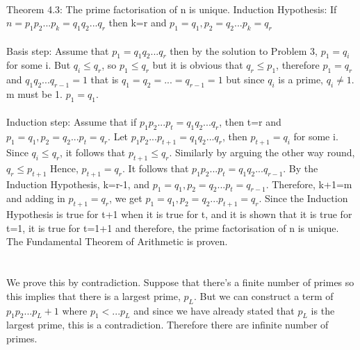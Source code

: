 \documentclass[a4paper,12pt]{article}
\begin{document}
\paragraph{}
Theorem 4.3: The prime factorisation of n is unique.
Induction Hypothesis: If $n=p_1p_2...p_k=q_1q_2...q_r$ then k=r and $p_1=q_1, p_2=q_2...p_k=q_r$
\paragraph{}
Basis step: Assume that $p_1=q_1q_2...q_r$ then by the solution to Problem 3, $p_1=q_i$ for some i. But $q_i\leq q_r$, so $p_1\leq q_r$ but it is obvious that $q_r\leq p_1$, therefore $p_1=q_r$ and $q_1q_2...q_{r-1}=1$ that is $q_1=q_2=...=q_{r-1}=1$ but since $q_i$ is a prime, $q_i\neq 1$. m must be 1. $p_1=q_1$.
\paragraph{}
Induction step: Assume that if $p_1p_2...p_t=q_1q_2...q_r$, then t=r and $p_1=q_1, p_2=q_2...p_t=q_r$. Let $p_1p_2...p_{t+1}=q_1q_2...q_r$, then $p_{t+1}=q_i$ for some i. Since $q_i\leq q_r$, it follows that $p_{t+1}\leq q_r$. Similarly by arguing the other way round, $q_r\leq p_{t+1}$ Hence, $p_{t+1}=q_r$. It follows that $p_1p_2...p_t=q_1q_2...q_{r-1}$. By the Induction Hypothesis, k=r-1, and $p_1=q_1, p_2=q_2...p_t=q_{r-1}$. Therefore, k+1=m and adding in $p_{t+1}=q_r$, we get $p_1=q_1, p_2=q_2...p_{t+1}=q_{r}$.
Since the Induction Hypothesis is true for t+1 when it is true for t, and it is shown that it is true for t=1, it is true for t=1+1 and therefore, the prime factorisation of n is unique. The Fundamental Theorem of Arithmetic is proven.

\section{}
We prove this by contradiction. Suppose that there's a finite number of primes so this implies that there is a largest prime, $p_L$. But we can construct a term of $p_1p_2...p_L+1$ where $p_1<...p_L$ and since we have already stated that $p_L$ is the largest prime, this is a contradiction. Therefore there are infinite number of primes.
\end{document}
